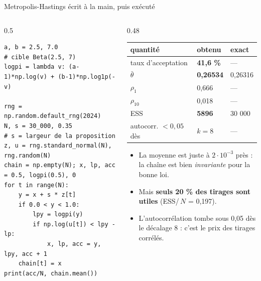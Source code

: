 \begin{frame}[fragile]{Metropolis-Hastings écrit à la main, puis exécuté}
\footnotesize
\begin{columns}[t]
\begin{column}{0.5\textwidth}
\begin{codebox}
\begin{lstlisting}
a, b = 2.5, 7.0                    # cible Beta(2.5, 7)
logpi = lambda v: (a-1)*np.log(v) + (b-1)*np.log1p(-v)

rng = np.random.default_rng(2024)
N, s = 30_000, 0.35                # s = largeur de la proposition
z, u = rng.standard_normal(N), rng.random(N)
chain = np.empty(N); x, lp, acc = 0.5, logpi(0.5), 0
for t in range(N):
    y = x + s * z[t]
    if 0.0 < y < 1.0:
        lpy = logpi(y)
        if np.log(u[t]) < lpy - lp:
            x, lp, acc = y, lpy, acc + 1
    chain[t] = x
print(acc/N, chain.mean())
\end{lstlisting}
\end{codebox}
\end{column}
\begin{column}{0.48\textwidth}
\begin{solbox}
\begin{tabular}{@{}lll@{}}
\toprule
quantité & obtenu & exact \\
\midrule
taux d'acceptation & \textbf{41,6 \%} & --- \\
$\bar\theta$ & \textbf{0,26534} & 0,26316 \\
$\rho_1$ & 0,666 & --- \\
$\rho_{10}$ & 0,018 & --- \\
ESS & \textbf{5896} & 30 000 \\
autocorr. $< 0{,}05$ dès & $k = 8$ & --- \\
\bottomrule
\end{tabular}
\end{solbox}
\begin{kbox}
\begin{itemize}
  \item La moyenne est juste à $2 \cdot 10^{-3}$ près : la chaîne est bien
        \emph{invariante} pour la bonne loi.
  \item Mais \textbf{seuls 20 \% des tirages sont utiles} (ESS/\,$N$ = 0,197).
  \item L'autocorrélation tombe sous 0,05 dès le décalage 8 : c'est le prix des
        tirages corrélés.
\end{itemize}
\end{kbox}
\end{column}
\end{columns}
\end{frame}


